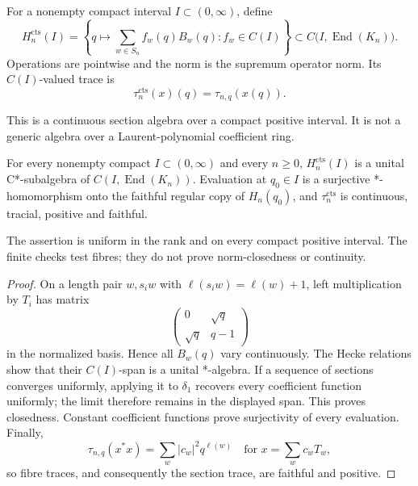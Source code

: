 \begin{definition}
For a nonempty compact interval $I\subset(0,\infty)$, define
\[
 H_n^{\mathrm{cts}}(I)
 =\left\{q\longmapsto\sum_{w\in S_n}f_w(q)B_w(q):
                   f_w\in C(I)\right\}
 \subset C\bigl(I,\operatorname{End}(K_n)\bigr).
\]
Operations are pointwise and the norm is the supremum operator norm.  Its
$C(I)$-valued trace is
\[
 \tau_n^{\mathrm{cts}}(x)(q)=\tau_{n,q}(x(q)).
\]
\end{definition}
\begin{scope}
This is a continuous section algebra over a compact positive interval.  It
is not a generic algebra over a Laurent-polynomial coefficient ring.
\end{scope}

\begin{theorem}
{\normalfont\statusProved}\quad
For every nonempty compact $I\subset(0,\infty)$ and every $n\geq0$,
$H_n^{\mathrm{cts}}(I)$ is a unital C*-subalgebra of
$C(I,\operatorname{End}(K_n))$.  Evaluation at $q_0\in I$ is a surjective
*-homomorphism onto the faithful regular copy of $H_n(q_0)$, and
$\tau_n^{\mathrm{cts}}$ is continuous, tracial, positive and faithful.
\end{theorem}
\begin{scope}
The assertion is uniform in the rank and on every compact positive interval.
The finite checks test fibres; they do not prove norm-closedness or
continuity.
\end{scope}
\begin{proof}
On a length pair $w,s_iw$ with $\ell(s_iw)=\ell(w)+1$, left multiplication
by $T_i$ has matrix
\[
 \begin{pmatrix}0&\sqrt q\\ \sqrt q&q-1\end{pmatrix}
\]
in the normalized basis.  Hence all $B_w(q)$ vary continuously.  The Hecke
relations show that their $C(I)$-span is a unital *-algebra.  If a sequence
of sections converges uniformly, applying it to $\delta_1$ recovers every
coefficient function uniformly; the limit therefore remains in the displayed
span.  This proves closedness.  Constant coefficient functions prove
surjectivity of every evaluation.  Finally,
\[
 \tau_{n,q}(x^*x)=\sum_w |c_w|^2q^{\ell(w)}
 \quad\text{for }x=\sum_wc_wT_w,
\]
so fibre traces, and consequently the section trace, are faithful and
positive.
\end{proof}

